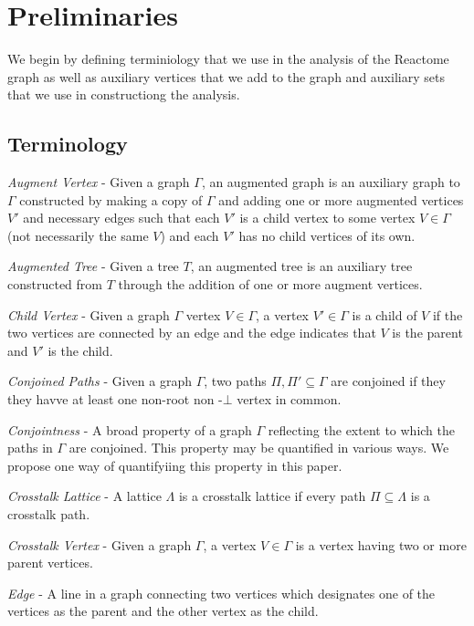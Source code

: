 \documentclass{article}
\begin{document}
\section{Preliminaries}

We begin by defining terminiology that we use in the analysis of the Reactome graph as well as auxiliary vertices that we add to the graph and auxiliary sets that we use in constructiong the analysis.

\subsection{Terminology}

\noindent\textit{Augment Vertex} - Given a graph $\Gamma$, an augmented graph is an auxiliary graph to $\Gamma$ constructed by making a copy of $\Gamma$ and adding one or more augmented vertices $V'$ and necessary edges such that each $V'$ is a child vertex to some vertex $V \in \Gamma$ (not necessarily the same $V$) and each $V'$ has no child vertices of its own.

\noindent\textit{Augmented Tree} - Given a tree $T$, an augmented tree is an auxiliary tree constructed from $T$ through the addition of one or more augment vertices.

\noindent\textit{Child Vertex} - Given a graph $\Gamma$ vertex $V \in \Gamma$, a vertex $V' \in \Gamma$ is a child of $V$ if the two vertices are connected by an edge and the edge indicates that $V$ is the parent and $V'$ is the child.

\noindent\textit{Conjoined Paths} - Given a graph $\Gamma$, two paths $\Pi, \Pi' \subseteq \Gamma$ are conjoined if they they havve at least one non-root non -$\bot$ vertex in common.

\noindent\textit{Conjointness} - A broad property of a graph $\Gamma$ reflecting the extent to which the paths in $\Gamma$ are conjoined. This property may be quantified in various ways. We propose one way of quantifyiing this property in this paper.

\noindent\textit{Crosstalk Lattice} - A lattice $\Lambda$ is a crosstalk lattice if every path $\Pi \subseteq \Lambda$ is a crosstalk path.

\noindent\textit{Crosstalk Vertex} - Given a graph $\Gamma$, a vertex $V \in \Gamma$ is a vertex having two or more parent vertices.

\noindent\textit{Edge} - A line in a graph connecting two vertices which designates one of the vertices as the parent and the other vertex as the child.
\end{document}
